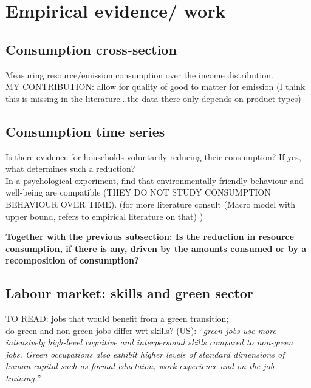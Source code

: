 \section{Empirical evidence/ work}


\subsection{Consumption cross-section }
Measuring resource/emission consumption over the income distribution.\\
MY CONTRIBUTION: allow for quality of good to matter for emission (I think this is missing in the literature...the data there only depends on product types)

\subsection{Consumption time series}
Is there evidence for households voluntarily reducing their consumption? If yes, what determines such a reduction?\\
 In a psychological experiment, \cite{Brown2005AreLifestyle} find that environmentally-friendly behaviour and well-being are compatible (THEY DO NOT STUDY CONSUMPTION BEHAVIOUR OVER TIME). 
(\ar for more literature consult \cite{Heikkinen2015DegrowthConsumers} (Macro model with upper bound, refers to empirical literature on that)
)



\textbf{Together with the previous subsection: Is the reduction in resource consumption, if there is any, driven by the amounts consumed or by a recomposition of consumption?
}
\subsection{Labour market: skills and green sector}
TO READ: \cite{Bowen2018CharacterisingComposition} jobs that would benefit from a green transition; \\
\cite{Consoli2016DoCapital} do green and non-green jobs differ wrt skills? (US): ``\textit{green jobs use more intensively high-level cognitive and interpersonal skills compared to non-green jobs. Green occupations also exhibit higher levels of standard dimensions of human capital such as formal eductaion, work experience and on-the-job training.}''

